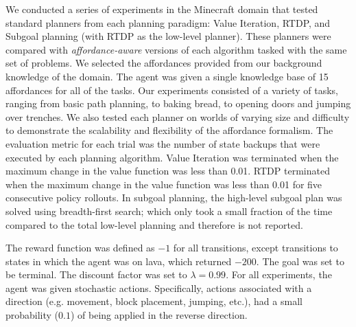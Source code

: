 \documentclass[]{article}
\begin{document}
We conducted a series of experiments in the Minecraft domain that
tested standard planners from each planning paradigm: Value Iteration,
RTDP, and Subgoal planning (with RTDP as the low-level planner). These
planners were compared with {\it affordance-aware} versions of each
algorithm tasked with the same set of problems. We selected the
affordances provided from our background knowledge of the domain. The
agent was given a single knowledge base of 15 affordances for all of the tasks.
Our experiments consisted of a variety of tasks, ranging from basic path planning, to baking bread,
to opening doors and jumping over trenches.  We also tested each
planner on worlds of varying size and difficulty to demonstrate the
scalability and flexibility of the affordance formalism. The
evaluation metric for each trial was the number of state backups that
were executed by each planning algorithm. Value
Iteration was terminated when the maximum change in the value function
was less than 0.01. RTDP terminated when the maximum change in the
value function was less than 0.01 for five consecutive policy
rollouts. In subgoal planning, the high-level subgoal plan was solved
using breadth-first search; which only took a small fraction of the
time compared to the total low-level planning and therefore is not
reported.

The reward function was defined as $-1$ for all transitions, except
transitions to states in which the agent was on lava, which returned 
$-200$. The goal was set to be terminal. The discount
factor was set to $\lambda = 0.99$. For all experiments, the agent was given stochastic actions. Specifically, actions associated with a direction (e.g. movement, block placement, jumping, etc.), had a small probability ($0.1$) of being applied in the reverse direction.
\end{document}
